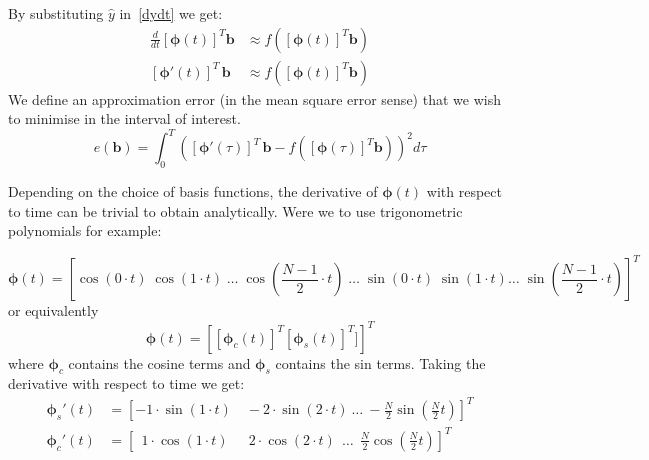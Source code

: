 \documentclass{article}
\begin{document}
    By substituting $\hat{y}$ in~\eqref{dydt} we get:
    \begin{align}
        \frac{d}{dt} \left[ \pmb{\phi}(t) \right]^T \pmb{b} &\approx f( \left[ \pmb{\phi}(t) \right]^T \pmb{b} ) \label{dPhidt}
        \\
        \left[ \pmb{\phi}'(t) \right]^T \, \pmb{b} &\approx f(  \left[ \pmb{\phi}(t) \right]^T \pmb{b} ) \label{dphi_fphi}
    \end{align}
    We define an approximation error (in the mean square error sense) that we wish to minimise in the interval of interest.
    \begin{equation}
        e(\pmb{b}) = \int_0^T
        \left(
        \left[ \pmb{\phi}'(\tau) \right]^T \, \pmb{b} - f( \left[ \pmb{\phi}(\tau) \right]^T \pmb{b} )
        \right)^2
        d\tau
    \end{equation}

    Depending on the choice of basis functions, the derivative of $\pmb{\phi}(t)$ with respect to time can be trivial to obtain analytically.
    Were we to use trigonometric polynomials for example:

    \begin{equation*}
        \pmb{\phi}(t)
        =
        \left[  \cos(0 \cdot t) \; \cos(1  \cdot t) \; \dots \; \cos(\frac{N-1}{2} \cdot t)
        \; \dots \;
        \sin(0  \cdot t) \; \sin(1 \cdot t) \dots \; \sin(\frac{N-1}{2}  \cdot t) \right]^T
    \end{equation*}
    or equivalently
    \begin{equation*}
        \pmb{\phi}(t) = \left[ \left[ \pmb{\phi}_c(t) \right]^T \left[ \pmb{\phi}_s(t) \right]^T ] \right]^T
    \end{equation*}
    where $\pmb{\phi}_c$ contains the cosine terms and $\pmb{\phi}_s$ contains the sin terms.
    Taking the derivative with respect to time we get:
    \begin{align}
        \pmb{\phi}_s'(t) &= \left[ -1 \cdot  \sin(1\cdot t ) \quad  -2 \cdot \sin(2\cdot t ) \  \dots \  -\frac{N}{2} \sin(\frac{N}{2}  t ) \right]^T \label{phis_dot}
        \\
        \pmb{\phi}_c'(t) &= \left[ \ \ 1 \cdot  \cos(1\cdot t ) \quad  \ \ 2 \cdot \cos(2\cdot t ) \ \  \dots \ \   \frac{N}{2} \cos(\frac{N}{2}  t ) \right]^T \label{phic_dot}
    \end{align}
\end{document}
